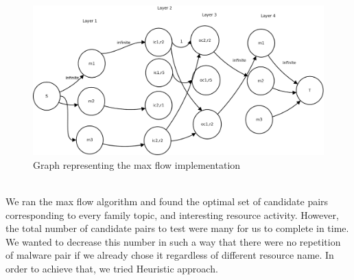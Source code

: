 \begin{figure}[h]
  \centering
  \includegraphics[scale=0.23]{figures/maxflow.png}
  \caption[Max Flow]{Graph representing the max flow implementation}\label{fig:maxflow}
\end{figure}
\\
We ran the max flow algorithm and found the optimal set of candidate pairs corresponding to every family topic, and interesting resource activity.
However, the total number of candidate pairs to test were many for us to complete in time.
We wanted to decrease this number in such a way that there were no repetition of malware pair if we already chose it regardless of different resource name.
In order to achieve that, we tried Heuristic approach.
